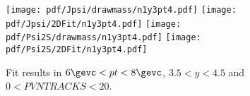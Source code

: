 \begin{figure}[H]
\begin{center}
\texttt{[image: pdf/Jpsi/drawmass/n1y3pt4.pdf]}
\texttt{[image: pdf/Jpsi/2DFit/n1y3pt4.pdf]}
\vspace*{-0.5cm}
\texttt{[image: pdf/Psi2S/drawmass/n1y3pt4.pdf]}
\texttt{[image: pdf/Psi2S/2DFit/n1y3pt4.pdf]}
\vspace*{-0.5cm}
\end{center}
\caption{Fit results in $6\gevc<pt<8\gevc$, $3.5<y<4.5$ and $0<PVNTRACKS<20$.}
\label{Fitn1y3pt4}
\end{figure}
